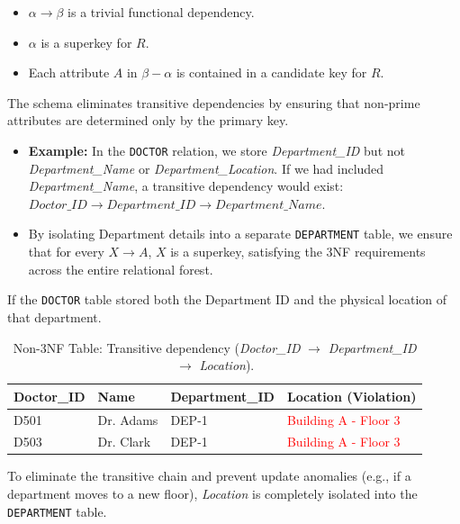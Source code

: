 \documentclass[12pt,a4paper]{article}
\begin{document}
\begin{itemize}[label=\textbf{--}]
	\item $\alpha \rightarrow \beta$ is a trivial functional dependency.
	\item $\alpha$ is a superkey for $R$.
	\item Each attribute $A$ in $\beta - \alpha$ is contained in a candidate key for $R$.
\end{itemize}

The schema eliminates transitive dependencies by ensuring that non-prime attributes are determined only by the primary key.
\begin{itemize}[label=$\bullet$]
	\item \textbf{Example:} In the \texttt{DOCTOR} relation, we store \textit{Department\_ID} but not \textit{Department\_Name} or \textit{Department\_Location}. If we had included \textit{Department\_Name}, a transitive dependency would exist: $Doctor\_ID \rightarrow Department\_ID \rightarrow Department\_Name$.
	\item By isolating Department details into a separate \texttt{DEPARTMENT} table, we ensure that for every $X \rightarrow A$, $X$ is a superkey, satisfying the 3NF requirements across the entire relational forest.
\end{itemize}

If the \texttt{DOCTOR} table stored both the Department ID and the physical location of that department.

\begin{table}[h]
	\centering
	\begin{tabular}{llll}
		\toprule
		\textbf{Doctor\_ID} & \textbf{Name} & \textbf{Department\_ID} & \textbf{Location (Violation)}         \\
		\midrule
		D501                & Dr. Adams     & DEP-1                   & \textcolor{red}{Building A - Floor 3} \\
		D503                & Dr. Clark     & DEP-1                   & \textcolor{red}{Building A - Floor 3} \\
		\bottomrule
	\end{tabular}
	\caption{Non-3NF Table: Transitive dependency (\textit{Doctor\_ID} $\rightarrow$ \textit{Department\_ID} $\rightarrow$ \textit{Location}).}
\end{table}
To eliminate the transitive chain and prevent update anomalies (e.g., if a department moves to a new floor), \textit{Location} is completely isolated into the \texttt{DEPARTMENT} table.
\end{document}
